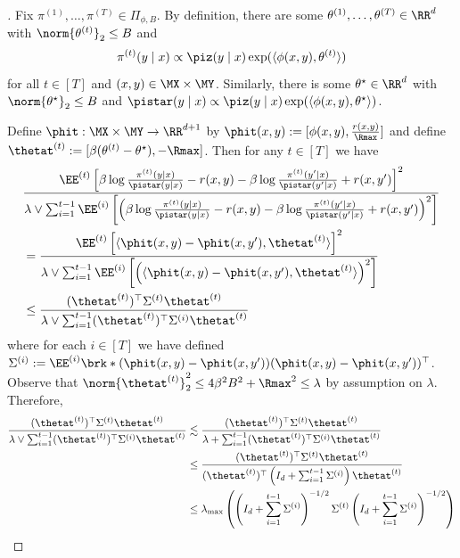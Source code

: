 \begin{proof}[]
Fix $\pi^{(1)},\dots,\pi^{(T)} \in \Pi_{\phi,B}.$ By definition, there are some $\theta^{(1)},\dots,\theta^{(T)} \in \RR^d$ with $\norm{\theta^{(t)}}_2 \leq B$ and \[\pi^{(t)}(y\mid x)\propto \piz(y\mid x)\exp(\langle \phi(x,y),\theta^{(t)}\rangle)\] for all $t \in [T]$ and $(x,y)\in\MX\times\MY$. Similarly, there is some $\theta^\star \in \RR^d$ with $\norm{\theta^\star}_2 \leq B$ and $\pistar(y\mid x) \propto \piz(y\mid x)\exp(\langle \phi(x,y),\theta^\star\rangle)$. 

Define $\phit:\MX\times\MY \to \RR^{d+1}$ by $\phit(x,y) := [\phi(x,y), \frac{r(x,y)}{\Rmax}]$ and define $\thetat^{(t)} := [\beta(\theta^{(t)} - \theta^\star), -\Rmax]$. Then for any $t \in [T]$ we have
\begin{align}
&\frac{\EE^{(t)}\left[\beta\log\frac{\pi^{(t)}(y\mid x)}{\pistar(y\mid x)} - r(x,y) - \beta\log\frac{\pi^{(t)}(y'\mid x)}{\pistar(y'\mid x)} + r(x,y')\right]^2}{\lambda \lor \sum_{i=1}^{t-1} \EE^{(i)}\left[\left(\beta\log\frac{\pi^{(t)}(y\mid x)}{\pistar(y\mid x)} - r(x,y) - \beta\log\frac{\pi^{(t)}(y'\mid x)}{\pistar(y'\mid x)} + r(x,y')\right)^2\right]} \\ 
&= \frac{\EE^{(t)}\left[\langle \phit(x,y) - \phit(x,y'), \thetat^{(t)}\rangle\right]^2}{\lambda \lor \sum_{i=1}^{t-1} \EE^{(i)}\left[\left(\langle \phit(x,y) - \phit(x,y'), \thetat^{(t)}\rangle\right)^2\right]} \\ 
&\leq \frac{(\thetat^{(t)})^\top \Sigma^{(t)} \thetat^{(t)}}{\lambda \lor \sum_{i=1}^{t-1} (\thetat^{(t)})^\top \Sigma^{(i)} \thetat^{(t)}}
\end{align}
where for each $i \in [T]$ we have defined $\Sigma^{(i)} := \EE^{(i)}\brk*{ (\phit(x,y) - \phit(x,y'))(\phit(x,y) - \phit(x,y'))^\top}$. Observe that $\norm{\thetat^{(t)}}_2^2 \leq 4\beta^2 B^2 + \Rmax^2 \leq \lambda$ by assumption on $\lambda$. Therefore,
\begin{align}
\frac{(\thetat^{(t)})^\top \Sigma^{(t)} \thetat^{(t)}}{\lambda \lor \sum_{i=1}^{t-1} (\thetat^{(t)})^\top \Sigma^{(i)} \thetat^{(t)}}
&\lesssim \frac{(\thetat^{(t)})^\top \Sigma^{(t)} \thetat^{(t)}}{\lambda + \sum_{i=1}^{t-1} (\thetat^{(t)})^\top \Sigma^{(i)} \thetat^{(t)}} \\ 
&\leq \frac{(\thetat^{(t)})^\top \Sigma^{(t)} \thetat^{(t)}}{(\thetat^{(t)})^\top \left(I_d + \sum_{i=1}^{t-1}\Sigma^{(i)}\right) \thetat^{(t)}} \\ 
&\leq \lambda_{\max}\left(\left(I_d + \sum_{i=1}^{t-1}\Sigma^{(i)}\right)^{-1/2} \Sigma^{(t)} \left(I_d + \sum_{i=1}^{t-1}\Sigma^{(i)}\right)^{-1/2}\right) \\ 

\end{align}
\end{proof}
